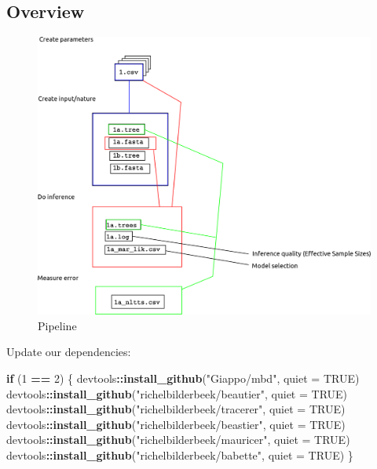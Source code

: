 \documentclass[]{article}
\newenvironment{Shaded}{\begin{snugshade}}{\end{snugshade}}
\newcommand{\KeywordTok}[1]{\textcolor[rgb]{0.13,0.29,0.53}{\textbf{#1}}}
\newcommand{\DataTypeTok}[1]{\textcolor[rgb]{0.13,0.29,0.53}{#1}}
\newcommand{\DecValTok}[1]{\textcolor[rgb]{0.00,0.00,0.81}{#1}}
\newcommand{\StringTok}[1]{\textcolor[rgb]{0.31,0.60,0.02}{#1}}
\newcommand{\OtherTok}[1]{\textcolor[rgb]{0.56,0.35,0.01}{#1}}
\newcommand{\ControlFlowTok}[1]{\textcolor[rgb]{0.13,0.29,0.53}{\textbf{#1}}}
\newcommand{\OperatorTok}[1]{\textcolor[rgb]{0.81,0.36,0.00}{\textbf{#1}}}
\newcommand{\NormalTok}[1]{#1}
\begin{document}
\subsection{Overview}\label{overview}

\begin{figure}
\centering
\includegraphics{pipeline.png}
\caption{Pipeline}
\end{figure}

Update our dependencies:

\begin{Shaded}
\begin{Highlighting}[]
\ControlFlowTok{if}\NormalTok{ (}\DecValTok{1} \OperatorTok{==}\StringTok{ }\DecValTok{2}\NormalTok{) \{}
\NormalTok{  devtools}\OperatorTok{::}\KeywordTok{install_github}\NormalTok{(}\StringTok{"Giappo/mbd"}\NormalTok{, }\DataTypeTok{quiet =} \OtherTok{TRUE}\NormalTok{)}
\NormalTok{  devtools}\OperatorTok{::}\KeywordTok{install_github}\NormalTok{(}\StringTok{"richelbilderbeek/beautier"}\NormalTok{, }\DataTypeTok{quiet =} \OtherTok{TRUE}\NormalTok{)}
\NormalTok{  devtools}\OperatorTok{::}\KeywordTok{install_github}\NormalTok{(}\StringTok{"richelbilderbeek/tracerer"}\NormalTok{, }\DataTypeTok{quiet =} \OtherTok{TRUE}\NormalTok{)}
\NormalTok{  devtools}\OperatorTok{::}\KeywordTok{install_github}\NormalTok{(}\StringTok{"richelbilderbeek/beastier"}\NormalTok{, }\DataTypeTok{quiet =} \OtherTok{TRUE}\NormalTok{)}
\NormalTok{  devtools}\OperatorTok{::}\KeywordTok{install_github}\NormalTok{(}\StringTok{"richelbilderbeek/mauricer"}\NormalTok{, }\DataTypeTok{quiet =} \OtherTok{TRUE}\NormalTok{)}
\NormalTok{  devtools}\OperatorTok{::}\KeywordTok{install_github}\NormalTok{(}\StringTok{"richelbilderbeek/babette"}\NormalTok{, }\DataTypeTok{quiet =} \OtherTok{TRUE}\NormalTok{)}
\NormalTok{\}}
\end{Highlighting}
\end{Shaded}
\end{document}
